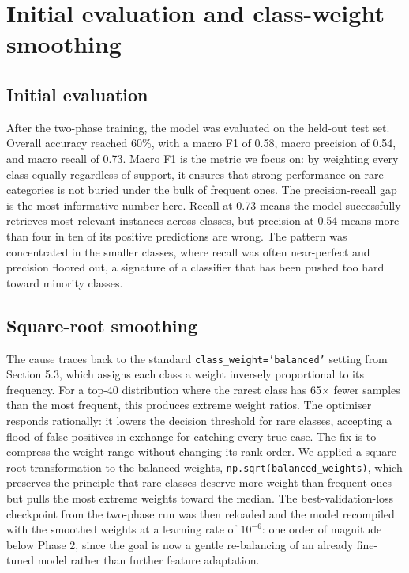 \section{Initial evaluation and class-weight smoothing}
\subsection{Initial evaluation}
After the two-phase training, the model was evaluated on the held-out test set. Overall accuracy reached 60\%, with a macro F1 of 0.58, macro precision of 0.54, and macro recall of 0.73. Macro F1 is the metric we focus on: by weighting every class equally regardless of support, it ensures that strong performance on rare categories is not buried under the bulk of frequent ones.
The precision-recall gap is the most informative number here. Recall at 0.73 means the model successfully retrieves most relevant instances across classes, but precision at 0.54 means more than four in ten of its positive predictions are wrong. The pattern was concentrated in the smaller classes, where recall was often near-perfect and precision floored out, a signature of a classifier that has been pushed too hard toward minority classes.

\subsection{Square-root smoothing}
The cause traces back to the standard \texttt{class\_weight='balanced'} setting from Section 5.3, which assigns each class a weight inversely proportional to its frequency. For a top-40 distribution where the rarest class has 65$\times$ fewer samples than the most frequent, this produces extreme weight ratios. The optimiser responds rationally: it lowers the decision threshold for rare classes, accepting a flood of false positives in exchange for catching every true case.
The fix is to compress the weight range without changing its rank order. We applied a square-root transformation to the balanced weights, \texttt{np.sqrt(balanced\_weights)}, which preserves the principle that rare classes deserve more weight than frequent ones but pulls the most extreme weights toward the median. 
The best-validation-loss checkpoint from the two-phase run was then reloaded and the model recompiled with the smoothed weights at a learning rate of $10^{-6}$: one order of magnitude below Phase 2, since the goal is now a gentle re-balancing of an already fine-tuned model rather than further feature adaptation.

